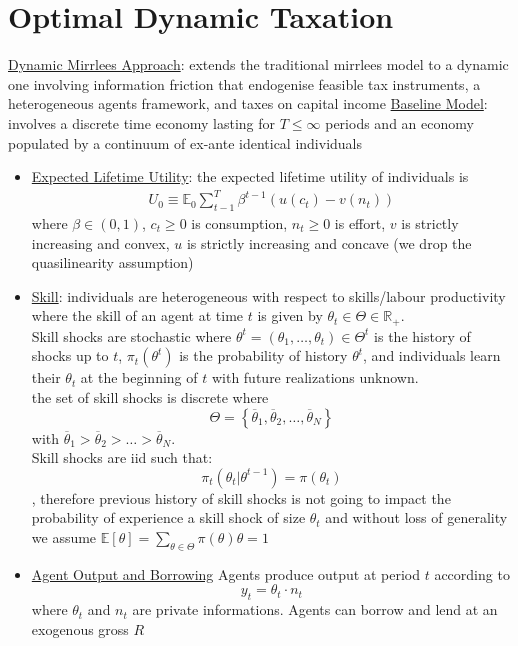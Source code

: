 \documentclass{article}
\begin{document}
\section{Optimal Dynamic Taxation}
\vspace{2.5mm}
\par \underline{Dynamic Mirrlees Approach}: extends the traditional mirrlees model to a dynamic one involving information friction that endogenise feasible tax instruments, a heterogeneous agents framework, and taxes on capital income
\underline{Baseline Model}: involves a discrete time economy lasting for $T \leq \infty$ periods and an economy populated by a continuum of ex-ante identical individuals
\begin{itemize}
    \item  \underline{Expected Lifetime Utility}: the expected lifetime utility of individuals is
    \begin{gather*}
        U_{0} \equiv \mathbb{E}_{0} \sum_{t-1}^{T} \beta^{t-1} (u(c_{t}) - v(n_{t}))
    \end{gather*}
    where $\beta \in (0,1)$, $c_{t} \geq 0$ is consumption, $n_{t} \geq 0$ is effort, $v$ is strictly increasing and convex, $u$ is strictly increasing and concave (we drop the quasilinearity assumption)
    \item  \underline{Skill}: individuals are heterogeneous with respect to skills/labour productivity where the skill of an agent at time $t$ is given by $\theta_{t} \in \Theta \in \mathbb{R}_{+}$.  \\ Skill shocks are stochastic where $\theta^{t} =  (\theta_{1}, \dots, \theta_{t}) \in \Theta^{t}$ is the history of shocks up to $t$, $\pi_{t} (\theta^{t})$ is the probability of history $\theta^{t}$, and individuals learn their $\theta_{t}$ at the beginning of $t$ with future realizations unknown. \\ the set of skill shocks is discrete where $$\Theta = \left\{ \overline{\theta}_{1}, \overline{\theta}_{2}, \dots, \overline{\theta}_{N} \right\}$$ with $\overline{\theta}_{1} > \overline{\theta}_{2} > \dots > \overline{\theta}_{N}$. \\ Skill shocks are iid such that: $$\pi_{t}(\theta_{t} |\theta^{t-1}) = \pi(\theta_{t})$$, therefore previous history of skill shocks is not going to impact the probability of experience a skill shock of size $\theta_{t}$ and without loss of generality we assume $\mathbb{E}[\theta] = \sum_{\theta \in \Theta}  \pi (\theta) \theta = 1$
    \item  \underline{Agent Output and Borrowing} Agents produce output at period $t$ according to $$y_{t} = \theta_{t} \cdot n_{t}$$ where $\theta_{t}$ and $n_{t}$ are private informations. Agents can borrow and lend at an exogenous gross $R$

\end{itemize}
\end{document}
